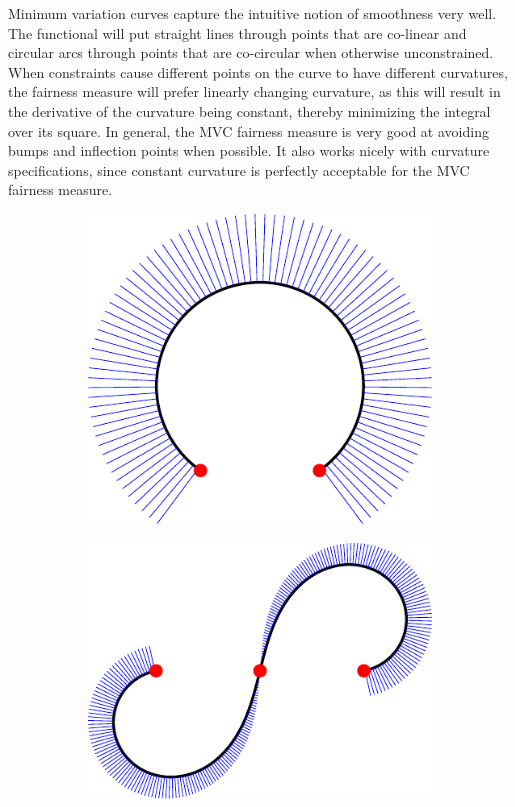 \documentclass[a4paper]{article}
\begin{document}
				Minimum variation curves capture the intuitive notion of smoothness very well. The functional will put straight lines through points that are co-linear and circular arcs through points that are co-circular when otherwise unconstrained. When constraints cause different points on the curve to have different curvatures, the fairness measure will prefer linearly changing curvature, as this will result in the derivative of the curvature being constant, thereby minimizing the integral over its square. In general, the MVC fairness measure is very good at avoiding bumps and inflection points when possible. It also works nicely with curvature specifications, since constant curvature is perfectly acceptable for the MVC fairness measure.

				\begin{figure}[htb]
					\centering
					\begin{subfigure}[b]{\textwidth / 3}
						\includegraphics[width=\textwidth]{content/output/fairness_mvc_1.pdf}
					\end{subfigure}%
					\begin{subfigure}[b]{\textwidth / 3}
						\includegraphics[width=\textwidth]{content/output/fairness_mvc_2.pdf}

\end{subfigure}
\end{figure}
\end{document}
